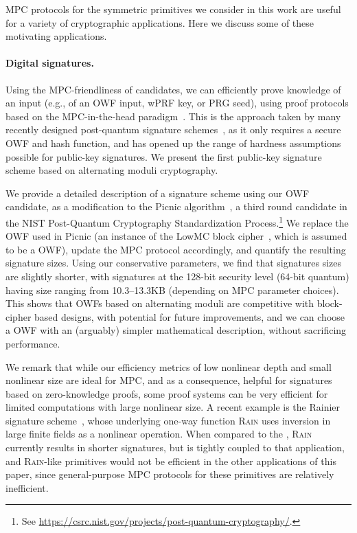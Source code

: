 MPC protocols for the symmetric primitives we consider in this work are useful for a variety of cryptographic applications. Here we discuss some of these motivating applications.

\paragraph{Digital signatures.} Using the MPC-friendliness of candidates, we can efficiently prove knowledge of
an input (e.g., of an OWF input, wPRF key, or PRG seed), using proof protocols
based on the MPC-in-the-head paradigm~\cite{ishai2007-zkmpc}.  This is the approach
taken by many recently designed post-quantum signature
schemes~\cite{chase2017-picnic,CCS:KatKolWan18,beullens2020-sigma-mq,beullens2020-legroast,guilhem2019-bbq,banquet},
as it only requires a secure OWF and hash function, and has opened up the range
of hardness assumptions possible for public-key signatures.  We present the
first public-key signature scheme based on alternating moduli cryptography.

We provide a detailed description of a signature scheme using our OWF candidate,
as a modification to the Picnic
algorithm~\cite{chase2017-picnic,CCS:KatKolWan18,kales2020-picnic,picnic-spec}, a
third round candidate in the NIST Post-Quantum Cryptography Standardization
Process.\footnote{See
\url{https://csrc.nist.gov/projects/post-quantum-cryptography/}.} We replace
the OWF used in Picnic (an instance of the LowMC block cipher~\cite{albrecht2015-lowmc}, which is assumed to be a OWF),
update the MPC protocol accordingly, and quantify the resulting signature
sizes.  Using our conservative \ttOWF parameters, we find that signatures sizes are slightly shorter, with signatures at
the 128-bit security level (64-bit quantum) having size ranging from 10.3--13.3KB (depending
on MPC parameter choices).  This
shows that OWFs based on alternating moduli are competitive with block-cipher
based designs, with potential for future improvements, and we can choose a OWF with an (arguably) simpler mathematical
description, without sacrificing performance.

\iffull
We remark that while our efficiency metrics of low nonlinear depth and small
nonlinear size are ideal for MPC, and as a consequence, helpful for signatures
based on zero-knowledge proofs, some proof systems can be very efficient for
limited computations with large nonlinear size.  A recent example is the
Rainier signature scheme~\cite{dobraunig2021-rainier}, whose underlying one-way
function \textsc{Rain} uses inversion in large finite fields as a nonlinear
operation. When compared to the \ttOWF, \textsc{Rain} currently results in
shorter signatures, but is tightly coupled to that application, and
\textsc{Rain}-like primitives would not be efficient in the other applications
of this paper, since general-purpose MPC protocols for these primitives are
relatively inefficient.
\fi

